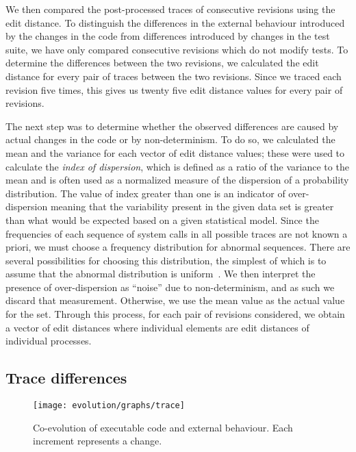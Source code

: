 We then compared the post-processed traces of consecutive revisions using the
edit distance. To distinguish the differences in the external behaviour
introduced by the changes in the code from differences introduced by changes in
the test suite, we have only compared consecutive revisions which do not modify
tests. To determine the differences between the two revisions, we calculated
the edit distance for every pair of traces between the two revisions. Since we
traced each revision five times, this gives us twenty five edit distance values
for every pair of revisions.

The next step was to determine whether the observed differences are caused by
actual changes in the code or by non-determinism. To do so, we
calculated the mean and the variance for each vector of edit distance values;
these were used to calculate the \emph{index of dispersion}, which is defined
as a ratio of the variance to the mean and is often used as a normalized
measure of the dispersion of a probability distribution. The value of index
greater than one is an indicator of over-dispersion meaning that the
variability present in the given data set is greater than what would be
expected based on a given statistical model. Since the frequencies of each
sequence of system calls in all possible traces are not known a priori, we must
choose a frequency distribution for abnormal sequences. There are several
possibilities for choosing this distribution, the simplest of which is to
assume that the abnormal distribution is uniform~\cite{helman97}. We then
interpret the presence of over-dispersion as ``noise'' due to non-determinism,
and as such we discard that measurement. Otherwise, we use the mean value as
the actual value for the set. Through this process, for each pair of revisions
considered, we obtain a vector of edit distances where individual elements are
edit distances of individual processes.

\subsection{Trace differences}

\begin{figure}[t]
  \begin{center}
    \texttt{[image: evolution/graphs/trace]}
    \caption{Co-evolution of executable code and external behaviour. Each
    increment represents a change.}
    \label{fig:coexternal}
  \end{center}
\end{figure}

